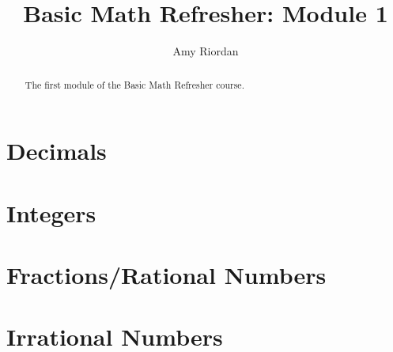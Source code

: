 \documentclass{xourse}
\title{Basic Math Refresher: Module 1}
\author{Amy Riordan}
\begin{document}
\begin{abstract}
    The first module of the Basic Math Refresher course.
\end{abstract}
\maketitle

\part{Decimals}


\part{Integers}


\part{Fractions/Rational Numbers}


\part{Irrational Numbers}

\end{document}
